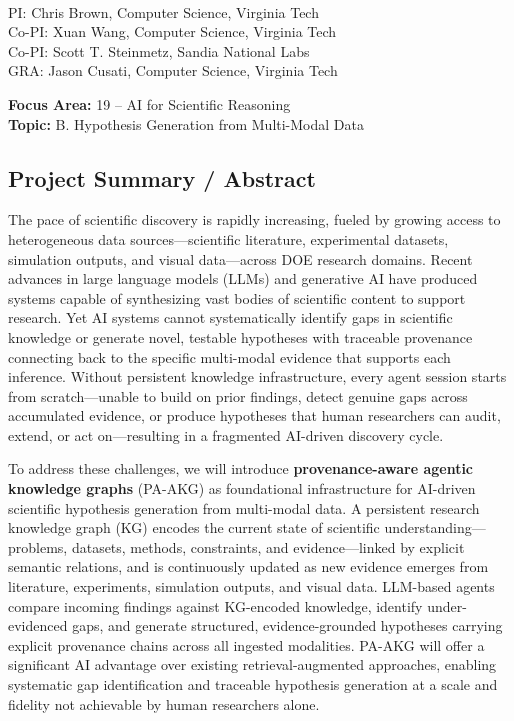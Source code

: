 \documentclass{files/proposalnsf}
\begin{document}
\begin{center}
    \large{\proposalNineteen} \\ \vspace{0.5pt}
\footnotesize{PI: Chris Brown, Computer Science, Virginia Tech} \\
\footnotesize{Co-PI: Xuan Wang, Computer Science, Virginia Tech} \\
\footnotesize{Co-PI: Scott T. Steinmetz, Sandia National Labs} \\
\footnotesize{GRA: Jason Cusati, Computer Science, Virginia Tech}
\end{center}

\small{\noindent\textbf{Focus Area:} 19 -- AI for Scientific Reasoning} \hfill \\
\small{\textbf{Topic:} B. Hypothesis Generation from Multi-Modal Data}

\subsection*{Project Summary / Abstract}

The pace of scientific discovery is rapidly increasing, fueled by growing access to heterogeneous data sources---scientific literature, experimental datasets, simulation outputs, and visual data---across DOE research domains. Recent advances in large language models (LLMs) and generative AI have produced systems capable of synthesizing vast bodies of scientific content to support research. Yet AI systems cannot systematically identify gaps in scientific knowledge or generate novel, testable hypotheses with traceable provenance connecting back to the specific multi-modal evidence that supports each inference. Without persistent knowledge infrastructure, every agent session starts from scratch---unable to build on prior findings, detect genuine gaps across accumulated evidence, or produce hypotheses that human researchers can audit, extend, or act on---resulting in a fragmented AI-driven discovery cycle.

To address these challenges, we will introduce \textbf{provenance-aware agentic knowledge graphs} (PA-AKG) as foundational infrastructure for AI-driven scientific hypothesis generation from multi-modal data. A persistent research knowledge graph (KG) encodes the current state of scientific understanding---problems, datasets, methods, constraints, and evidence---linked by explicit semantic relations, and is continuously updated as new evidence emerges from literature, experiments, simulation outputs, and visual data. LLM-based agents compare incoming findings against KG-encoded knowledge, identify under-evidenced gaps, and generate structured, evidence-grounded hypotheses carrying explicit provenance chains across all ingested modalities. PA-AKG will offer a significant AI advantage over existing retrieval-augmented approaches, enabling systematic gap identification and traceable hypothesis generation at a scale and fidelity not achievable by human researchers alone.
\end{document}
